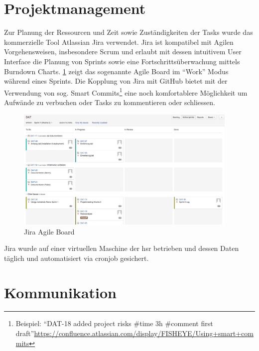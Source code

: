 \section{Projektmanagement}

Zur Planung der Ressourcen und Zeit sowie Zuständigkeiten der Tasks wurde das kommerzielle Tool Atlassian Jira verwendet. Jira ist kompatibel mit Agilen Vorgehensweisen, insbesondere Scrum und erlaubt mit dessen intuitivem User Interface die Planung von Sprints sowie eine Fortschrittsüberwachung mittels Burndown Charts. \cref{fig:pm:jira-agile} zeigt das sogenannte Agile Board im ``Work'' Modus während eines Sprints. Die Kopplung von Jira mit GitHub bietet mit der Verwendung von sog. Smart Commits\footnote{Beispiel: ``DAT-18 added project risks \#time 3h \#comment first draft''\newline\url{https://confluence.atlassian.com/display/FISHEYE/Using+smart+commits}} eine noch komfortablere Möglichkeit um Aufwände zu verbuchen oder Tasks zu kommentieren oder schliessen.

\begin{figure}[H]
	\centering
	\includegraphics[width=0.95\textwidth]{fig/jira-agile}
	\caption{Jira Agile Board}
	\label{fig:pm:jira-agile}
\end{figure}

Jira wurde auf einer virtuellen Maschine der \acs{hsr} betrieben und dessen Daten täglich und automatisiert via cronjob gesichert.


\section{Kommunikation}
